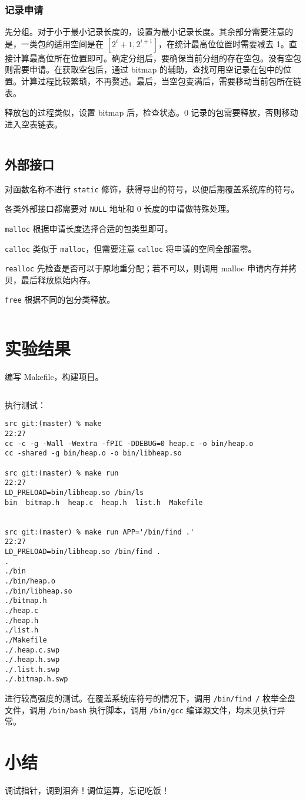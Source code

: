 \documentclass[12pt, a4paper]{article}
\newcommand{\LabSrc}[1]{\inputminted[fontsize=\scriptsize, breaklines]{c}{./src/#1.c}}
\begin{document}
\LabSrc{buck_addr}

\subsubsection{记录申请}
先分组。对于小于最小记录长度的，设置为最小记录长度。其余部分需要注意的是，一类包的适用空间是在 $[2^i+1, 2^{i+1}]$，在统计最高位位置时需要减去 1。直接计算最高位所在位置即可。确定分组后，要确保当前分组的存在空包。没有空包则需要申请。在获取空包后，通过 bitmap 的辅助，查找可用空记录在包中的位置。计算过程比较繁琐，不再赘述。最后，当空包变满后，需要移动当前包所在链表。

释放包的过程类似，设置 bitmap 后，检查状态。0 记录的包需要释放，否则移动进入空表链表。

\LabSrc{buck_alloc}

\subsection{外部接口}
对函数名称不进行 \texttt{static} 修饰，获得导出的符号，以便后期覆盖系统库的符号。

各类外部接口都需要对 \texttt{NULL} 地址和 0 长度的申请做特殊处理。

\texttt{malloc} 根据申请长度选择合适的包类型即可。

\texttt{calloc} 类似于 \texttt{malloc}，但需要注意 \texttt{calloc} 将申请的空间全部置零。

\texttt{realloc} 先检查是否可以于原地重分配；若不可以，则调用 malloc 申请内存并拷贝，最后释放原始内存。

\texttt{free} 根据不同的包分类释放。

\LabSrc{interface}

\section{实验结果}

编写 Makefile，构建项目。

\inputminted[fontsize=\scriptsize, breaklines]{makefile}{../src/Makefile}

执行测试：

{\scriptsize
\begin{verbatim}
src git:(master) % make                                                          22:27
cc -c -g -Wall -Wextra -fPIC -DDEBUG=0 heap.c -o bin/heap.o
cc -shared -g bin/heap.o -o bin/libheap.so

src git:(master) % make run                                                      22:27
LD_PRELOAD=bin/libheap.so /bin/ls
bin  bitmap.h  heap.c  heap.h  list.h  Makefile


src git:(master) % make run APP='/bin/find .'                                    22:27
LD_PRELOAD=bin/libheap.so /bin/find .
.
./bin
./bin/heap.o
./bin/libheap.so
./bitmap.h
./heap.c
./heap.h
./list.h
./Makefile
./.heap.c.swp
./.heap.h.swp
./.list.h.swp
./.bitmap.h.swp
\end{verbatim}
}

进行较高强度的测试。在覆盖系统库符号的情况下，调用 \texttt{/bin/find /} 枚举全盘文件，调用 \texttt{/bin/bash} 执行脚本，调用 \texttt{/bin/gcc} 编译源文件，均未见执行异常。

\section{小结}
调试指针，调到泪奔！调位运算，忘记吃饭！
\end{document}

